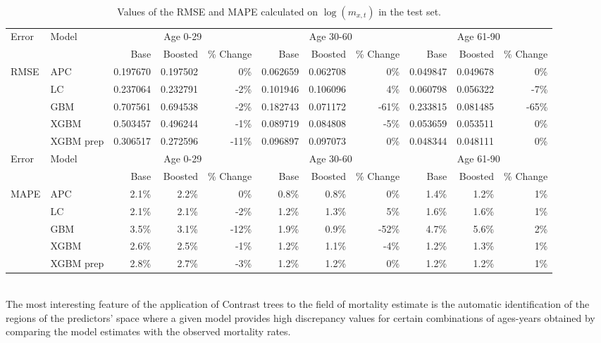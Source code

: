 \documentclass[fleqn,10pt]{wlscirep}
\begin{document}
\begin{table}[ht]
\centering
\footnotesize
\begin{tabular}{|l|l|r|r|r|r|r|r|r|r|r|}
\hline
\multirow{2}{*}{Error} & \multirow{2}{*}{Model} & \multicolumn{3}{c|}{Age 0-29} & \multicolumn{3}{c|}{Age 30-60} & \multicolumn{3}{c|}{Age 61-90} \\
\cline{3-11}
&			&	Base 	&	Boosted 	& \% Change &	Base 	&	Boosted 	& \% Change &	Base 	&	Boosted	& \% Change\\
\hline
\multirow{5}{*}{RMSE}  & APC 		&	0.197670	&	0.197502	&	0\%		&	0.062659	&	0.062708	&	0\%	&	0.049847	&	0.049678	&	0\%	\\
& LC 		&	0.237064	&	0.232791	&	-2\%		&	0.101946	&	0.106096	&	4\%	&	0.060798	&	0.056322	&	-7\%	\\
& GBM 		&	0.707561	&	0.694538	&	-2\%		&	0.182743	&	0.071172	&	-61\%	&	0.233815	&	0.081485	&	-65\%	\\
& XGBM 		&	0.503457	&	0.496244	&	-1\%		&	0.089719	&	0.084808	&	-5\%	&	0.053659	&	0.053511	&	0\%	\\
& XGBM prep 	&	0.306517	&	0.272596	&	-11\%	&	0.096897	&	0.097073	&	0\%	&	0.048344	&	0.048111	&	0\%	\\
\hline
\multirow{2}{*}{Error} & \multirow{2}{*}{Model} & \multicolumn{3}{c|}{Age 0-29} & \multicolumn{3}{c|}{Age 30-60} & \multicolumn{3}{c|}{Age 61-90} \\
\cline{3-11}
&			&	Base 	&	Boosted 	& \% Change &	Base 	&	Boosted 	& \% Change &	Base 	&	Boosted	& \% Change\\
\hline
\multirow{5}{*}{MAPE}  & APC 	&	2.1\%	&	2.2\%	&	0\%		&	0.8\%	&	0.8\%	&	0\%		&	1.4\%	&	1.2\%	&	1\%	\\
& LC 		&	2.1\%	&	2.1\%	&	-2\%		&	1.2\%	&	1.3\%	&	5\%		&	1.6\%	&	1.6\%	&	1\%	\\
& GBM 		&	3.5\%	&	3.1\%	&	-12\%	&	1.9\%	&	0.9\%	&	-52\%	&	4.7\%	&	5.6\%	&	2\%	\\
& XGBM 		&	2.6\%	&	2.5\%	&	-1\%		&	1.2\%	&	1.1\%	&	-4\%		&	1.2\%	&	1.3\%	&	1\%	\\
& XGBM prep 	&	2.8\%	&	2.7\%	&	-3\%		&	1.2\%	&	1.2\%	&	0\%		&	1.2\%	&	1.2\%	&	1\%	\\\hline
\end{tabular}
\caption{Values of the RMSE and MAPE calculated on $\log{\left(m_{x,t}\right)}$ in the test set.}
\label{tab:errors_log}
\end{table}\\
%
\color{blue} 
The most interesting feature of the application of Contrast trees to the field of mortality estimate is the automatic identification of the regions of the predictors' space where a given model provides high discrepancy values for certain combinations of ages-years obtained by comparing the model estimates with the observed mortality rates.
\end{document}
